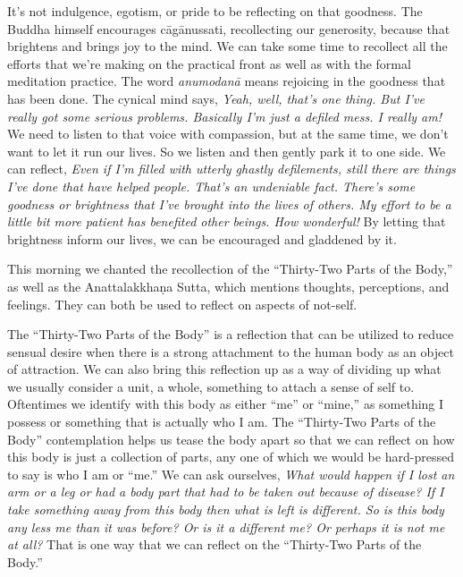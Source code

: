 It's not indulgence, egotism, or pride to be reflecting on that 
goodness. The Buddha himself encourages cāgānussati, recollecting our 
generosity, because that brightens and brings joy to the mind. We can 
take some time to recollect all the efforts that we're making on the 
practical front as well as with the formal meditation practice. The 
word \emph{anumodanā} means rejoicing in the goodness that has been 
done. The cynical mind says, \emph{Yeah, well, that's one thing. But 
I've really got some serious problems. Basically I'm just a defiled 
mess. I really am!} We need to listen to that voice with compassion, 
but at the same time, we don't want to let it run our lives. So we 
listen and then gently park it to one side. We can reflect, \emph{Even 
if I'm filled with utterly ghastly defilements, still there are things 
I've done that have helped people. That's an undeniable fact. There's 
some goodness or brightness that I've brought into the lives of others. 
My effort to be a little bit more patient has benefited other beings. 
How wonderful!} By letting that brightness inform our lives, we can be 
encouraged and gladdened by it.


This morning we chanted the recollection of the ``Thirty-Two Parts of 
the Body,'' as well as the Anattalakkhaṇa Sutta, which mentions 
thoughts, perceptions, and feelings. They can both be used to reflect 
on aspects of not-self.

The ``Thirty-Two Parts of the Body'' is a reflection that can be 
utilized to reduce sensual desire when there is a strong attachment to 
the human body as an object of attraction. We can also bring this 
reflection up as a way of dividing up what we usually consider a unit, 
a whole, something to attach a sense of self to. Oftentimes we identify 
with this body as either ``me'' or ``mine,'' as something I possess or 
something that is actually who I am. The ``Thirty-Two Parts of the 
Body'' contemplation helps us tease the body apart so that we can 
reflect on how this body is just a collection of parts, any one of 
which we would be hard-pressed to say is who I am or ``me.'' We can ask 
ourselves, \emph{What would happen if I lost an arm or a leg or had a 
body part that had to be taken out because of disease? If I take 
something away from this body then what is left is different. So is 
this body any less me than it was before? Or is it a different me? Or 
perhaps it is not me at all?} That is one way that we can reflect on 
the ``Thirty-Two Parts of the Body.''

